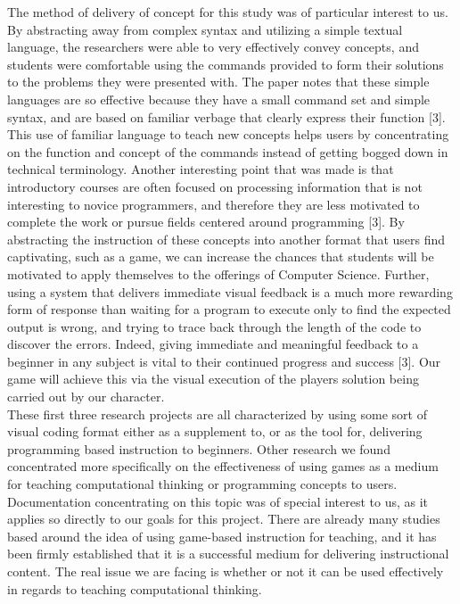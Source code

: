 The method of delivery of concept for this study was of particular interest to us. By 
abstracting away from complex syntax and utilizing a simple textual language, the 
researchers were able to very effectively convey concepts, and students were 
comfortable using the commands provided to form their solutions to the problems 
they were presented with. The paper notes that these simple languages are so effective 
because they have a small command set and simple syntax, and are based on familiar 
verbage that clearly express their function [3]. This use of familiar language to teach 
new concepts helps users by concentrating on the function and concept of the 
commands instead of getting bogged down in technical terminology. Another interesting 
point that was made is that introductory courses are often focused on processing 
information that is not interesting to novice programmers, and therefore they are 
less motivated to complete the work or pursue fields centered around programming [3]. 
By abstracting the instruction of these concepts into another format that users find 
captivating, such as a game, we can increase the chances that students will be motivated 
to apply themselves to the offerings of Computer Science. Further, using a system that 
delivers immediate visual feedback is a much more rewarding form of response than 
waiting for a program to execute only to find the expected output is wrong, and trying 
to trace back through the length of the code to discover the errors. Indeed, giving 
immediate and meaningful feedback to a beginner in any subject is vital to their 
continued progress and success [3]. Our game will achieve this via the visual execution 
of the players solution being carried out by our character. \\

These first three research projects are all characterized by using some sort of visual 
coding format either as a supplement to, or as the tool for, delivering programming 
based instruction to beginners. Other research we found concentrated more specifically 
on the effectiveness of using games as a medium for teaching computational thinking 
or programming concepts to users. Documentation concentrating on this topic was of 
special interest to us, as it applies so directly to our goals for this project. There are 
already many studies based around the idea of using game-based instruction for teaching, 
and it has been firmly established that it is a successful medium for delivering instructional 
content. The real issue we are facing is whether or not it can be used effectively in regards 
to teaching computational thinking.\\

